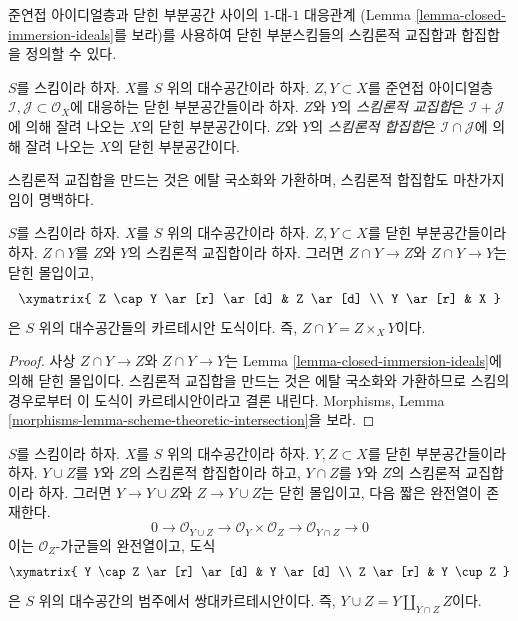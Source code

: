 \noindent
준연접 아이디얼층과 닫힌 부분공간 사이의 $1$-대-$1$ 대응관계
(Lemma \ref{lemma-closed-immersion-ideals}를 보라)를 사용하여
닫힌 부분스킴들의 스킴론적 교집합과 합집합을 정의할 수 있다.

\begin{definition}
\label{definition-scheme-theoretic-intersection-union}
$S$를 스킴이라 하자. $X$를 $S$ 위의 대수공간이라 하자.
$Z, Y \subset X$를 준연접 아이디얼층
$\mathcal{I}, \mathcal{J} \subset \mathcal{O}_X$에 대응하는
닫힌 부분공간들이라 하자.
$Z$와 $Y$의 {\it 스킴론적 교집합}은
$\mathcal{I} + \mathcal{J}$에 의해 잘려 나오는 $X$의 닫힌
부분공간이다.
$Z$와 $Y$의 {\it 스킴론적 합집합}은
$\mathcal{I} \cap \mathcal{J}$에 의해 잘려 나오는 $X$의 닫힌
부분공간이다.
\end{definition}

\noindent
스킴론적 교집합을 만드는 것은 에탈 국소화와 가환하며,
스킴론적 합집합도 마찬가지임이 명백하다.

\begin{lemma}
\label{lemma-scheme-theoretic-intersection}
$S$를 스킴이라 하자. $X$를 $S$ 위의 대수공간이라 하자.
$Z, Y \subset X$를 닫힌 부분공간들이라 하자.
$Z \cap Y$를 $Z$와 $Y$의 스킴론적 교집합이라 하자.
그러면 $Z \cap Y \to Z$와 $Z \cap Y \to Y$는 닫힌 몰입이고,
$$
\xymatrix{
Z \cap Y \ar[r] \ar[d] & Z \ar[d] \\
Y \ar[r] & X
}
$$
은 $S$ 위의 대수공간들의 카르테시안 도식이다. 즉,
$Z \cap Y = Z \times_X Y$이다.
\end{lemma}

\begin{proof}
사상 $Z \cap Y \to Z$와 $Z \cap Y \to Y$는
Lemma \ref{lemma-closed-immersion-ideals}에 의해 닫힌 몰입이다.
스킴론적 교집합을 만드는 것은 에탈 국소화와 가환하므로
스킴의 경우로부터 이 도식이 카르테시안이라고 결론 내린다.
Morphisms, Lemma
\ref{morphisms-lemma-scheme-theoretic-intersection}을 보라.
\end{proof}

\begin{lemma}
\label{lemma-scheme-theoretic-union}
$S$를 스킴이라 하자. $X$를 $S$ 위의 대수공간이라 하자.
$Y, Z \subset X$를 닫힌 부분공간들이라 하자.
$Y \cup Z$를 $Y$와 $Z$의 스킴론적 합집합이라 하고,
$Y \cap Z$를 $Y$와 $Z$의 스킴론적 교집합이라 하자.
그러면 $Y \to Y \cup Z$와 $Z \to Y \cup Z$는 닫힌 몰입이고,
다음 짧은 완전열이 존재한다.
$$
0 \to \mathcal{O}_{Y \cup Z} \to \mathcal{O}_Y \times \mathcal{O}_Z
\to \mathcal{O}_{Y \cap Z} \to 0
$$
이는 $\mathcal{O}_Z$-가군들의 완전열이고, 도식
$$
\xymatrix{
Y \cap Z \ar[r] \ar[d] & Y \ar[d] \\
Z \ar[r] & Y \cup Z
}
$$
은 $S$ 위의 대수공간의 범주에서 쌍대카르테시안이다. 즉,
$Y \cup Z = Y \amalg_{Y \cap Z} Z$이다.
\end{lemma}

